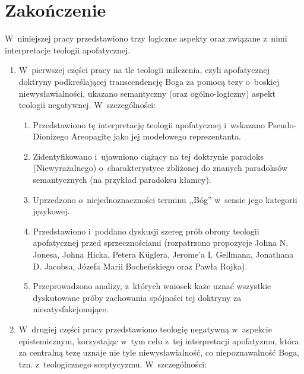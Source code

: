 \chapter*{Zakończenie}

W~niniejszej pracy przedstawiono trzy logiczne aspekty oraz związane z~nimi interpretacje teologii apofatycznej.

\begin{enumerate}
\item  W~pierwszej części pracy na tle teologii milczenia, czyli apofatycznej doktryny podkreślającej transcendencję Boga za pomocą tezy o~boskiej niewysławialności, ukazano semantyczny (oraz ogólno-logiczny) aspekt teologii negatywnej. W~szczególności:
\begin{enumerate}
\item Przedstawiono tę interpretację teologii apofatycznej i~wskazano Pseudo-Dionizego Areopagitę jako jej modelowego reprezentanta.
\item Zidentyfikowano i~ujawniono ciążący na tej doktrynie paradoks (Niewyrażalnego) o~charakterystyce zbliżonej do znanych paradoksów semantycznych (na przykład paradoksu kłamcy).
\item Uprzedzono o~niejednoznaczności terminu ,,Bóg'' w~sensie jego kategorii językowej.
\item Przedstawiono i~poddano dyskusji szereg prób obrony teologii apofatycznej przed sprzecznościami (rozpatrzono propozycje Johna N. Jonesa, Johna Hicka, Petera Küglera, Jerome'a I. Gellmana, Jonathana D. Jacobsa, Józefa Marii Bocheńskiego oraz Pawła Rojka).
\item Przeprowadzono analizy, z~których wniosek każe uznać wszystkie dyskutowane próby zachowania spójności tej doktryny za niesatysfakcjonujące.
\end{enumerate}
\item W~drugiej części pracy przedstawiono teologię negatywną w~aspekcie epistemicznym, korzystając w~tym celu z~tej interpretacji apofatyzmu, która za centralną tezę uznaje nie tyle niewysławialność, co niepoznawalność Boga, tzn. z~teologicznego sceptycyzmu. W~szczególności:
\begin{enumerate}

\end{enumerate}
\end{enumerate}

